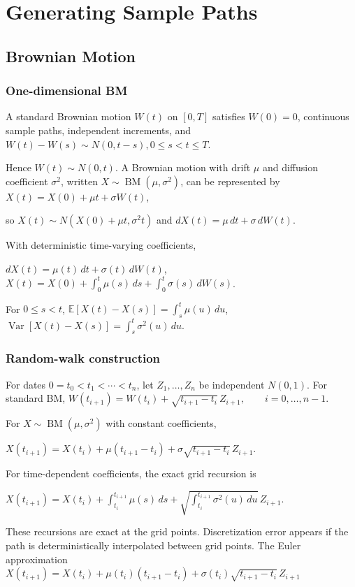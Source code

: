\section{Generating Sample Paths}

\subsection{Brownian Motion}

\subsubsection*{One-dimensional BM}

A standard Brownian motion $W(t)$ on $[0,T]$ satisfies $W(0)=0$, continuous sample paths, independent increments, and
$W(t)-W(s)\sim N(0,t-s), 0\le s<t\le T$.

Hence $W(t)\sim N(0,t)$. A Brownian motion with drift $\mu$ and diffusion coefficient $\sigma^2$, written $X\sim\operatorname{BM}(\mu,\sigma^2)$, can be represented by
$X(t)=X(0)+\mu t+\sigma W(t)$,

so $X(t)\sim N(X(0)+\mu t,\sigma^2t)$ and
$dX(t)=\mu\,dt+\sigma\,dW(t)$.

With deterministic time-varying coefficients,

$dX(t)=\mu(t)\,dt+\sigma(t)\,dW(t)$,
$X(t)=X(0)+\int_0^t\mu(s)\,ds+\int_0^t\sigma(s)\,dW(s)$.

For $0\le s<t$,
$\mathbb{E}[X(t)-X(s)]=\int_s^t\mu(u)\,du$,
$\operatorname{Var}[X(t)-X(s)]=\int_s^t\sigma^2(u)\,du$.

\subsubsection*{Random-walk construction}

For dates $0=t_0<t_1<\cdots<t_n$, let $Z_1,\ldots,Z_n$ be independent $N(0,1)$. For standard BM,
$W(t_{i+1})=W(t_i)+\sqrt{t_{i+1}-t_i}\,Z_{i+1},\qquad i=0,\ldots,n-1$.

For $X\sim\operatorname{BM}(\mu,\sigma^2)$ with constant coefficients,

$X(t_{i+1})=X(t_i)+\mu(t_{i+1}-t_i)+\sigma\sqrt{t_{i+1}-t_i}\,Z_{i+1}$.

For time-dependent coefficients, the exact grid recursion is

$X(t_{i+1})=X(t_i)+\int_{t_i}^{t_{i+1}}\mu(s)\,ds+\sqrt{\int_{t_i}^{t_{i+1}}\sigma^2(u)\,du}\,Z_{i+1}$.

These recursions are exact at the grid points. Discretization error appears if the path is deterministically interpolated between grid points. The Euler approximation
$X(t_{i+1})=X(t_i)+\mu(t_i)(t_{i+1}-t_i)+\sigma(t_i)\sqrt{t_{i+1}-t_i}\,Z_{i+1}$

